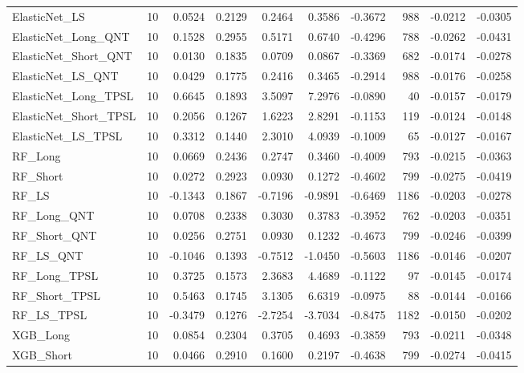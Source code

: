 \begin{tabular}{llrrrrrrrr}
\cline{1-10}
ElasticNet\_LS & 10 & 0.0524 & 0.2129 & 0.2464 & 0.3586 & -0.3672 & 988 & -0.0212 & -0.0305 \\
\cline{1-10}
ElasticNet\_Long\_QNT & 10 & 0.1528 & 0.2955 & 0.5171 & 0.6740 & -0.4296 & 788 & -0.0262 & -0.0431 \\
\cline{1-10}
ElasticNet\_Short\_QNT & 10 & 0.0130 & 0.1835 & 0.0709 & 0.0867 & -0.3369 & 682 & -0.0174 & -0.0278 \\
\cline{1-10}
ElasticNet\_LS\_QNT & 10 & 0.0429 & 0.1775 & 0.2416 & 0.3465 & -0.2914 & 988 & -0.0176 & -0.0258 \\
\cline{1-10}
ElasticNet\_Long\_TPSL & 10 & 0.6645 & 0.1893 & 3.5097 & 7.2976 & -0.0890 & 40 & -0.0157 & -0.0179 \\
\cline{1-10}
ElasticNet\_Short\_TPSL & 10 & 0.2056 & 0.1267 & 1.6223 & 2.8291 & -0.1153 & 119 & -0.0124 & -0.0148 \\
\cline{1-10}
ElasticNet\_LS\_TPSL & 10 & 0.3312 & 0.1440 & 2.3010 & 4.0939 & -0.1009 & 65 & -0.0127 & -0.0167 \\
\cline{1-10}
RF\_Long & 10 & 0.0669 & 0.2436 & 0.2747 & 0.3460 & -0.4009 & 793 & -0.0215 & -0.0363 \\
\cline{1-10}
RF\_Short & 10 & 0.0272 & 0.2923 & 0.0930 & 0.1272 & -0.4602 & 799 & -0.0275 & -0.0419 \\
\cline{1-10}
RF\_LS & 10 & -0.1343 & 0.1867 & -0.7196 & -0.9891 & -0.6469 & 1186 & -0.0203 & -0.0278 \\
\cline{1-10}
RF\_Long\_QNT & 10 & 0.0708 & 0.2338 & 0.3030 & 0.3783 & -0.3952 & 762 & -0.0203 & -0.0351 \\
\cline{1-10}
RF\_Short\_QNT & 10 & 0.0256 & 0.2751 & 0.0930 & 0.1232 & -0.4673 & 799 & -0.0246 & -0.0399 \\
\cline{1-10}
RF\_LS\_QNT & 10 & -0.1046 & 0.1393 & -0.7512 & -1.0450 & -0.5603 & 1186 & -0.0146 & -0.0207 \\
\cline{1-10}
RF\_Long\_TPSL & 10 & 0.3725 & 0.1573 & 2.3683 & 4.4689 & -0.1122 & 97 & -0.0145 & -0.0174 \\
\cline{1-10}
RF\_Short\_TPSL & 10 & 0.5463 & 0.1745 & 3.1305 & 6.6319 & -0.0975 & 88 & -0.0144 & -0.0166 \\
\cline{1-10}
RF\_LS\_TPSL & 10 & -0.3479 & 0.1276 & -2.7254 & -3.7034 & -0.8475 & 1182 & -0.0150 & -0.0202 \\
\cline{1-10}
XGB\_Long & 10 & 0.0854 & 0.2304 & 0.3705 & 0.4693 & -0.3859 & 793 & -0.0211 & -0.0348 \\
\cline{1-10}
XGB\_Short & 10 & 0.0466 & 0.2910 & 0.1600 & 0.2197 & -0.4638 & 799 & -0.0274 & -0.0415 \\

\end{tabular}
